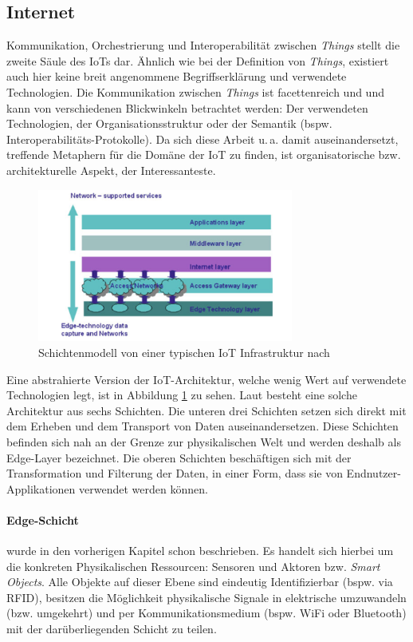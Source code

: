 \subsection{Internet}
Kommunikation, Orchestrierung und Interoperabilität zwischen \textit{Things} stellt die zweite Säule des \acp{IoT} dar. Ähnlich wie bei der Definition von \textit{Things}, existiert auch hier keine breit angenommene Begriffserklärung und verwendete Technologien. Die Kommunikation zwischen \textit{Things} ist facettenreich und und kann von verschiedenen Blickwinkeln betrachtet werden: Der verwendeten Technologien, der Organisationsstruktur oder der Semantik (bspw. Interoperabilitäts-Protokolle). Da sich diese Arbeit u.\,a. damit auseinandersetzt, treffende Metaphern für die Domäne der \ac{IoT} zu finden, ist organisatorische bzw. architekturelle Aspekt, der Interessanteste.
\begin{figure}[h]
    \centering
    \includegraphics[width=0.75\textwidth]{bilder/chapter2/iotlayers.png}
    \caption{Schichtenmodell von einer typischen \ac{IoT} Infrastruktur nach \cite{bandyopadhyay2011internet}}
    \label{fig:iotlayer}
\end{figure}
Eine abstrahierte Version der \ac{IoT}-Architektur, welche wenig Wert auf verwendete Technologien legt, ist in Abbildung \ref{fig:iotlayer} zu sehen. Laut \cite{bandyopadhyay2011internet} besteht eine solche Architektur aus sechs Schichten. Die unteren drei Schichten setzen sich direkt mit dem Erheben und dem Transport von Daten auseinandersetzen. Diese Schichten befinden sich nah an der Grenze zur physikalischen Welt und werden deshalb als Edge-Layer bezeichnet. Die oberen Schichten beschäftigen sich mit der Transformation und Filterung der Daten, in einer Form, dass sie von Endnutzer-Applikationen verwendet werden können.  

\paragraph{Edge-Schicht} wurde in den vorherigen Kapitel schon beschrieben. Es handelt sich hierbei um die konkreten Physikalischen Ressourcen: Sensoren und Aktoren bzw. \textit{Smart Objects}. Alle Objekte auf dieser Ebene sind eindeutig Identifizierbar (bspw. via RFID), besitzen die Möglichkeit physikalische Signale in elektrische umzuwandeln (bzw. umgekehrt) und per Kommunikationsmedium (bspw. WiFi oder Bluetooth) mit der darüberliegenden Schicht zu teilen.


